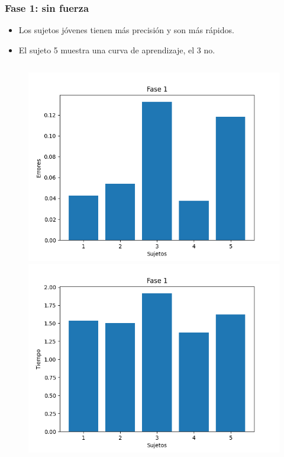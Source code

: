 \documentclass[pdf]{beamer}
\begin{document}
\begin{frame}
	\frametitle{Fase 1: sin fuerza}
			\begin{itemize}
		\item Los sujetos jóvenes tienen más precisión y son más rápidos.
		\item El sujeto 5 muestra una curva de aprendizaje, el 3 no.
	\end{itemize}
	\begin{columns}
		\begin{column}{0.4\textwidth}
			\begin{figure}
			\includegraphics[width=\textwidth]{fase1-errores}
			\includegraphics[width=\textwidth]{fase1-time}
			\end{figure}


\end{column}
\end{columns}
\end{frame}
\end{document}
